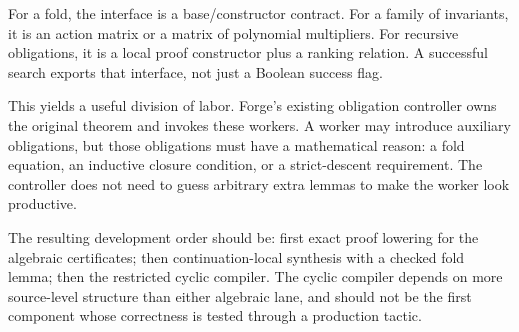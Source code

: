 For a fold, the interface is a base/constructor contract. For a family of
invariants, it is an action matrix or a matrix of polynomial multipliers. For
recursive obligations, it is a local proof constructor plus a ranking relation.
A successful search exports that interface, not just a Boolean success flag.

This yields a useful division of labor. Forge's existing obligation controller
owns the original theorem and invokes these workers. A worker may introduce
auxiliary obligations, but those obligations must have a mathematical reason:
a fold equation, an inductive closure condition, or a strict-descent requirement.
The controller does not need to guess arbitrary extra lemmas to make the worker
look productive.

The resulting development order should be: first exact proof lowering for the
algebraic certificates; then continuation-local synthesis with a checked fold
lemma; then the restricted cyclic compiler. The cyclic compiler depends on more
source-level structure than either algebraic lane, and should not be the first
component whose correctness is tested through a production tactic.
